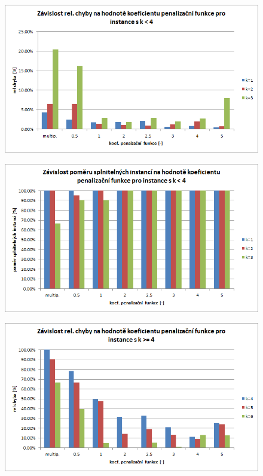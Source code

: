 \documentclass[12pt,oneside,a4paper]{article}
\begin{document}
\begin{figure}[ht]
\centering
\includegraphics[scale=0.9]{obr/pen-err-min.png}
\end{figure}

\begin{figure}[ht]
\centering
\includegraphics[scale=0.9]{obr/pen-sat-min.png}
\end{figure}

\begin{figure}[ht]
\centering
\includegraphics[scale=0.9]{obr/pen-err-max.png}
\end{figure}
\end{document}
